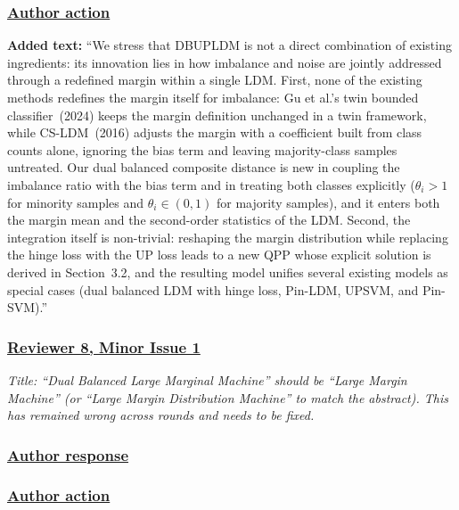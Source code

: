 \documentclass[journal,12pt, onecolumn]{IEEEtran}
\begin{document}
{\color{black}
\subsubsection*{\textbf{\underline{Author action}}}
\begin{center}
{\color{red}}
\end{center}
\textbf{Added text:} ``{\color{red}We stress that DBUPLDM is not a direct combination of existing ingredients: its innovation lies in how imbalance and noise are jointly addressed through a redefined margin within a single LDM. First, none of the existing methods redefines the margin itself for imbalance: Gu et al.'s twin bounded classifier~(2024) keeps the margin definition unchanged in a twin framework, while CS-LDM~(2016) adjusts the margin with a coefficient built from class counts alone, ignoring the bias term and leaving majority-class samples untreated. Our dual balanced composite distance is new in coupling the imbalance ratio with the bias term and in treating both classes explicitly ($\theta_i>1$ for minority samples and $\theta_i\in(0,1)$ for majority samples), and it enters both the margin mean and the second-order statistics of the LDM. Second, the integration itself is non-trivial: reshaping the margin distribution while replacing the hinge loss with the UP loss leads to a new QPP whose explicit solution is derived in Section~3.2, and the resulting model unifies several existing models as special cases (dual balanced LDM with hinge loss, Pin-LDM, UPSVM, and Pin-SVM).}''
}


{\color{customgreen}
\subsubsection*{\underline{\textbf{Reviewer 8, Minor Issue 1}}}
\emph{Title: ``Dual Balanced Large Marginal Machine'' should be ``Large Margin Machine'' (or ``Large Margin Distribution Machine'' to match the abstract). This has remained wrong across rounds and needs to be fixed.}
}


{\color{black}
\subsubsection*{\textbf{\underline{Author response}}}
}


{\color{black}
\subsubsection*{\textbf{\underline{Author action}}}
}
\end{document}
